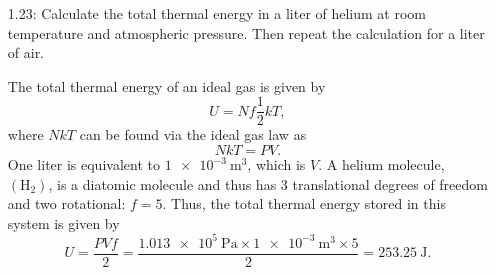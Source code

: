 \documentclass[a4paper, 12pt]{config/homework}
\begin{document}
\begin{enumerate}
\vspace{\baselineskip}
\item[1.23:] Calculate the total thermal energy in a liter of helium at room temperature and atmospheric pressure. Then repeat the calculation for a liter of air.

The total thermal energy of an ideal gas is given by
\[U = Nf\frac{1}{2}kT,\]
where \(NkT\) can be found via the ideal gas law as
\[NkT = PV.\]
One liter is equivalent to \(\qty{1e-3}{\meter\cubed}\), which is \(V\). A helium molecule, \((\text{H}_2)\), is a diatomic molecule and thus has 3 translational degrees of freedom and two rotational: \(f=5\). Thus, the total thermal energy stored in this system is given by
\[U = \frac{PVf}{2} = \frac{\qty{1.013e5}{\pascal}\times\qty{1e-3}{\meter\cubed}\times5}{2} = \qty{253.25}{\joule}.\]

\end{enumerate}
\end{document}
